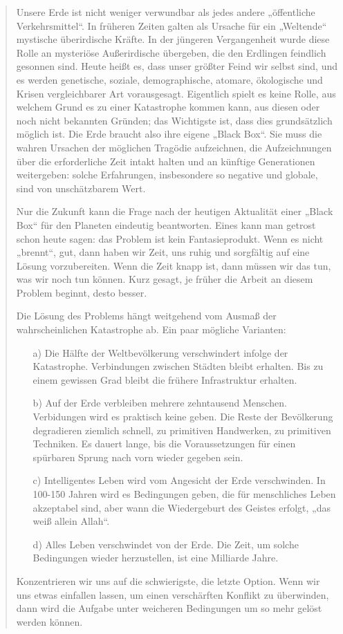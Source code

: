 \documentclass[11pt,a4paper]{article}
\begin{document}
{\begin{quote}
Unsere Erde ist nicht weniger verwundbar als jedes andere „öffentliche
Verkehrsmittel“. In früheren Zeiten galten als Ursache für ein „Weltende“
mystische über\-irdische Kräfte. In der jüngeren Vergangenheit wurde diese
Rolle an mysteriöse Außerirdische übergeben, die den Erdlingen feindlich
gesonnen sind.  Heute heißt es, dass unser größter Feind wir selbst sind, und
es werden genetische, soziale, demographische, atomare, ökologische und Krisen
vergleichbarer Art vorausgesagt. Eigentlich spielt es keine Rolle, aus welchem
Grund es zu einer Katastrophe kommen kann, aus diesen oder noch nicht
bekannten Gründen; das Wichtigste ist, dass dies grundsätzlich möglich ist.
Die Erde braucht also ihre eigene „Black Box“. Sie muss die wahren Ursachen
der möglichen Tragödie aufzeichnen, die Aufzeichnungen über die erforderliche
Zeit intakt halten und an künftige Generationen weitergeben: solche
Erfahrungen, insbesondere so negative und globale, sind von unschätzbarem
Wert.

Nur die Zukunft kann die Frage nach der heutigen Aktualität einer „Black Box“
für den Planeten eindeutig beantworten.  Eines kann man getrost schon heute
sagen: das Problem ist kein Fantasieprodukt. Wenn es nicht „brennt“, gut, dann
haben wir Zeit, uns ruhig und sorgfältig auf eine Lösung vorzubereiten. Wenn
die Zeit knapp ist, dann müssen wir das tun, was wir noch tun können. Kurz
gesagt, je früher die Arbeit an diesem Problem beginnt, desto besser.

Die Lösung des Problems hängt weitgehend vom Ausmaß der wahrscheinlichen
Katastrophe ab. Ein paar mögliche Varianten:
\begin{itemize}[noitemsep]
\item[a)] Die Hälfte der Weltbevölkerung verschwindert infolge der
  Katastrophe.  Verbindungen zwischen Städten bleibt erhalten. Bis zu einem
  gewissen Grad bleibt die frühere Infrastruktur erhalten.
\item[b)] Auf der Erde verbleiben mehrere zehntausend Menschen. Verbidungen
  wird es praktisch keine geben. Die Reste der Bevölkerung degradieren
  ziemlich schnell, zu primitiven Handwerken, zu primitiven Techniken. Es
  dauert lange, bis die Voraussetzungen für einen spürbaren Sprung nach vorn
  wieder gegeben sein.
\item[c)] Intelligentes Leben wird vom Angesicht der Erde verschwinden. In
  100-150 Jahren wird es Bedingungen geben, die für menschliches Leben
  akzeptabel sind, aber wann die Wiedergeburt des Geistes erfolgt, „das weiß
  allein Allah“.
\item[d)] Alles Leben verschwindet von der Erde. Die Zeit, um solche
  Bedingungen wieder herzustellen, ist eine Milliarde Jahre.
\end{itemize}
Konzentrieren wir uns auf die schwierigste, die letzte Option. Wenn wir uns
etwas einfallen lassen, um einen verschärften Konflikt zu überwinden, dann
wird die Aufgabe unter weicheren Bedingungen um so mehr gelöst werden können.


\end{quote}}
\end{document}
